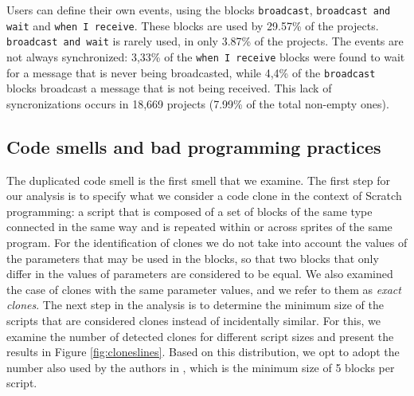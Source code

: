 \documentclass{sig-alternate}
\begin{document}
Users can define their own events, using the blocks \texttt{broadcast}, \texttt{broadcast and wait} and \texttt{when I receive}. 
These blocks are used by 29.57\% of the projects. \texttt{broadcast and wait} is rarely used, in only 3.87\% of the projects. The events are not always synchronized: 3,33\% of the \texttt{when I receive} blocks were found to wait for a message that is never being broadcasted, while 4,4\% of the \texttt{broadcast} blocks broadcast a message that is not being received. This lack of syncronizations occurs in 18,669 projects (7.99\% of the total non-empty ones).

\noindent
{}


\subsection{Code smells and bad programming practices}

The duplicated code smell is the first smell that we examine. The first step for our analysis is to specify what we consider a code clone in the context of Scratch programming: a script that is composed of a set of blocks of the same type connected in the same way and is repeated within or across sprites of the same program. For the identification of clones we do not take into account the values of the parameters that may be used in the blocks, so that two blocks that only differ in the values of parameters are considered to be equal. We also examined the case of clones with the same parameter values, and we refer to them as \textit{exact clones}. The next step in the analysis is to determine the minimum size of the scripts that are considered clones instead of incidentally similar. For this, we examine the number of detected clones for different script sizes and present the results in Figure \ref{fig:cloneslines}. Based on this distribution, we opt to adopt the number also used by the authors in \cite{moreno_automatic_2014}, which is the minimum size of 5 blocks per script.
\end{document}
